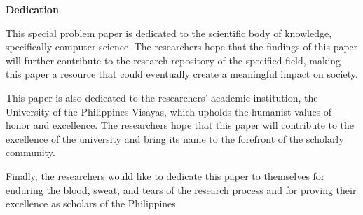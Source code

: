 \begin{center}
	\textbf{Dedication}
\end{center}

This special problem paper is dedicated to the scientific body of knowledge, specifically computer science. The researchers hope that the findings of this paper will further contribute to the research repository of the specified field, making this paper a resource that could eventually create a meaningful impact on society.

This paper is also dedicated to the researchers’ academic institution, the University of the Philippines Visayas, which upholds the humanist values of honor and excellence. The researchers hope that this paper will contribute to the excellence of the university and bring its name to the forefront of the scholarly community.

Finally, the researchers would like to dedicate this paper to themselves for enduring the blood, sweat, and tears of the research process and for proving their excellence as scholars of the Philippines. 
